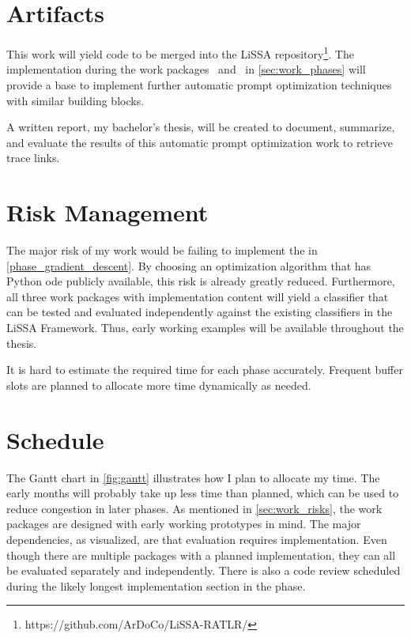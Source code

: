 \section{Artifacts}
\label{sec:work_artifacts}
This work will yield code to be merged into the LiSSA repository\footnote{https://github.com/ArDoCo/LiSSA-RATLR/}.
The implementation during the work packages~ and~ in \autoref{sec:work_phases} will provide a base to implement further automatic prompt optimization techniques with similar building blocks.

A written report, my bachelor's thesis, will be created to document, summarize, and evaluate the results of this automatic prompt optimization work to retrieve trace links.


\section{Risk Management}
\label{sec:work_risks}
The major risk of my work would be failing to implement the  in \autoref{phase_gradient_descent}.
By choosing an optimization algorithm that has Python ode publicly available, this risk is already greatly reduced.
Furthermore, all three work packages with implementation content will yield a classifier that can be tested and evaluated independently against the existing classifiers in the LiSSA Framework.
Thus, early working examples will be available throughout the thesis.

It is hard to estimate the required time for each phase accurately.
Frequent buffer slots are planned to allocate more time dynamically as needed.




\section{Schedule}
\label{sec:work_gant}
The Gantt chart in \autoref{fig:gantt} illustrates how I plan to allocate my time.
The early months will probably take up less time than planned, which can be used to reduce congestion in later phases.
As mentioned in \autoref{sec:work_risks}, the work packages are designed with early working prototypes in mind.
The major dependencies, as visualized, are that evaluation requires implementation. 
Even though there are multiple packages with a planned implementation, they can all be evaluated separately and independently.
There is also a code review scheduled during the likely longest implementation section in the  phase.


